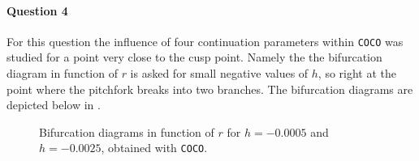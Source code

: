 \documentclass[a4paper,11pt]{article}
\begin{document}
\paragraph{Question 4}\: For this question the influence of four continuation parameters within \texttt{COCO} was studied for 
a point very close to the cusp point. Namely the the bifurcation diagram in function of $r$ is asked for small 
negative values of $h$, so right at the point where the pitchfork breaks into two branches.
The bifurcation diagrams are depicted below in .
\begin{figure}[H]
	\centering
	\caption{Bifurcation diagrams in function of $r$ for $h=-0.0005$ and $h=-0.0025$, obtained with \texttt{COCO}.}
	\label{fig:bifh}
\end{figure}
\end{document}
